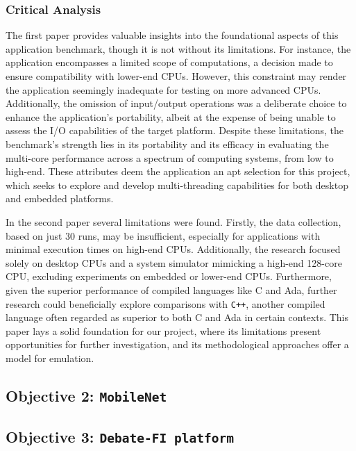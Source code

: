 \subsubsection{Critical Analysis}
The first paper\cite{JetBench_paper} provides valuable insights into the foundational aspects of this application benchmark, though it is not without its limitations. For instance, the application encompasses a limited scope of computations, a decision made to ensure compatibility with lower-end CPUs. However, this constraint may render the application seemingly inadequate for testing on more advanced CPUs. Additionally, the omission of input/output operations was a deliberate choice to enhance the application's portability, albeit at the expense of being unable to assess the I/O capabilities of the target platform. Despite these limitations, the benchmark's strength lies in its portability and its efficacy in evaluating the multi-core performance across a spectrum of computing systems, from low to high-end. These attributes deem the application an apt selection for this project, which seeks to explore and develop multi-threading capabilities for both desktop and embedded platforms.

In the second paper\cite{mpbenchmark_paper} several limitations were found. Firstly, the data collection, based on just 30 runs, may be insufficient, especially for applications with minimal execution times on high-end CPUs. Additionally, the research focused solely on desktop CPUs and a system simulator mimicking a high-end 128-core CPU, excluding experiments on embedded or lower-end CPUs. Furthermore, given the superior performance of compiled languages like C and Ada, further research could beneficially explore comparisons with \texttt{C++}, another compiled language often regarded as superior to both C and Ada in certain contexts. This paper lays a solid foundation for our project, where its limitations present opportunities for further investigation, and its methodological approaches offer a model for emulation.

\subsection{Objective 2: \texttt{MobileNet}}

\subsection{Objective 3: \texttt{Debate-FI platform}}


